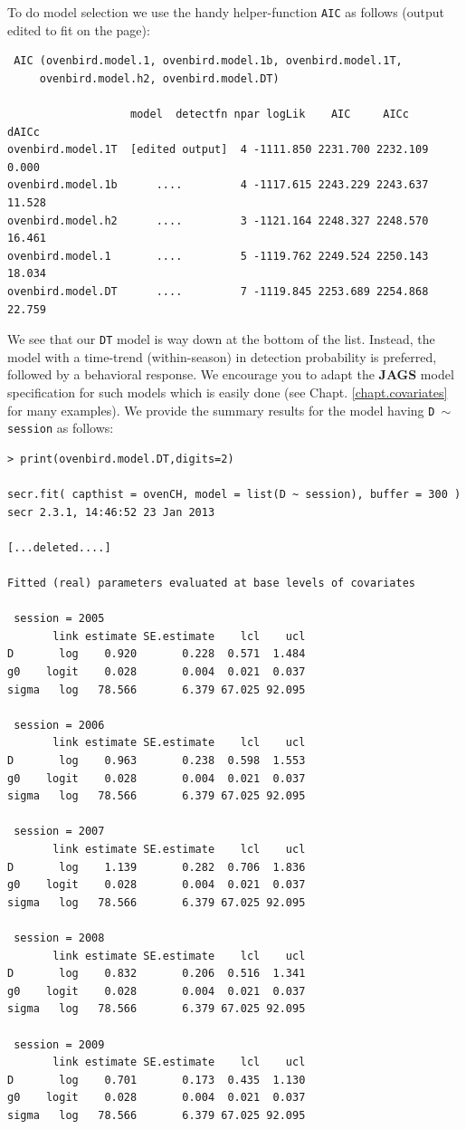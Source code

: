 To do model selection  we use the handy helper-function \mbox{\tt AIC}
as follows (output edited to fit on the page):
{\small
\begin{verbatim}
 AIC (ovenbird.model.1, ovenbird.model.1b, ovenbird.model.1T,
     ovenbird.model.h2, ovenbird.model.DT)

                   model  detectfn npar logLik    AIC     AICc     dAICc 
ovenbird.model.1T  [edited output]  4 -1111.850 2231.700 2232.109  0.000
ovenbird.model.1b      ....         4 -1117.615 2243.229 2243.637 11.528
ovenbird.model.h2      ....         3 -1121.164 2248.327 2248.570 16.461
ovenbird.model.1       ....         5 -1119.762 2249.524 2250.143 18.034
ovenbird.model.DT      ....         7 -1119.845 2253.689 2254.868 22.759
\end{verbatim}
}
We see that our \mbox{\tt DT} model is way down at the bottom of the list.
Instead, 
the model with a time-trend (within-season) in detection probability
is preferred, followed by a behavioral response. We encourage you to
adapt the {\bf JAGS} model specification for such models which is easily
done (see Chapt. \ref{chapt.covariates} for many examples).
We provide the summary results for the model having \mbox{\tt D $\sim$
  session} as follows:
{\small
\begin{verbatim}
> print(ovenbird.model.DT,digits=2)

secr.fit( capthist = ovenCH, model = list(D ~ session), buffer = 300 )
secr 2.3.1, 14:46:52 23 Jan 2013

[...deleted....]

Fitted (real) parameters evaluated at base levels of covariates 

 session = 2005 
       link estimate SE.estimate    lcl    ucl
D       log    0.920       0.228  0.571  1.484
g0    logit    0.028       0.004  0.021  0.037
sigma   log   78.566       6.379 67.025 92.095

 session = 2006 
       link estimate SE.estimate    lcl    ucl
D       log    0.963       0.238  0.598  1.553
g0    logit    0.028       0.004  0.021  0.037
sigma   log   78.566       6.379 67.025 92.095

 session = 2007 
       link estimate SE.estimate    lcl    ucl
D       log    1.139       0.282  0.706  1.836
g0    logit    0.028       0.004  0.021  0.037
sigma   log   78.566       6.379 67.025 92.095

 session = 2008 
       link estimate SE.estimate    lcl    ucl
D       log    0.832       0.206  0.516  1.341
g0    logit    0.028       0.004  0.021  0.037
sigma   log   78.566       6.379 67.025 92.095

 session = 2009 
       link estimate SE.estimate    lcl    ucl
D       log    0.701       0.173  0.435  1.130
g0    logit    0.028       0.004  0.021  0.037
sigma   log   78.566       6.379 67.025 92.095
\end{verbatim}
} 
